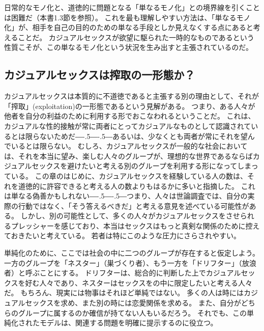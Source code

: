 \documentclass[paper=a4,book,openany]{jlreq}
\def\DDASH{―\kern-.5\zw―\kern-.5\zw―} %
\begin{document}
日常的なモノ化と、道徳的に問題となる「単なるモノ化」との境界線を引くことは困難だ（本書1.3節を参照）。
これを最も理解しやすい方法は、「単なるモノ化」が、相手を自己の目的のための単なる手段としか見えなくする点にあると考えることだ。
カジュアルセックスが欲望に駆られた一時的なものであるという性質こそが、この単なるモノ化という状況を生み出すと主張されているのだ。

\subsection{カジュアルセックスは搾取の一形態か？}

カジュアルセックスは本質的に不道徳であると主張する別の理由として、それが「搾取」(exploitation)の一形態であるという見解がある。
つまり、ある人々が他者を自分の利益のために利用する形でおこなわれるということだ。
これは、カジュアルな性的接触が常に両者にとってカジュアルなものとして認識されているとは限らないためだ{\DDASH}あるいは、少なくとも両者が常にそれを望んでいるとは限らない。
むしろ、カジュアルセックスが一般的な社会においては、それを本当に望み、楽しむ人々のグループが、理想的な世界であるならばカジュアルセックスを避けたいと考える別のグループを利用する形になってしまっている。
この章のはじめに、カジュアルセックスを経験している人の数は、それを道徳的に許容できると考える人の数よりもはるかに多いと指摘した。
これは単なる偽善かもしれない{\DDASH}つまり、人々は世論調査では、自分の実際の行動ではなく、「そう答えるべきだ」と考える意見を述べている可能性がある。
しかし、別の可能性として、多くの人々がカジュアルセックスをさせられるプレッシャーを感じており、本当はセックスはもっと真剣な関係のために控えておきたいと考えている。
若者は特にこのような圧力にさらされやすい。

単純化のために、ここでは社会の中に二つのグループが存在すると仮定しよう。
一方のグループを「ネスター」（巣づくり者）、もう一方を「ドリフター」（放浪者）と呼ぶことにする。
ドリフターは、総合的に判断した上でカジュアルセックスを好む人々であり、ネスターはセックスをの中に限定したいと考える人々だ。
もちろん、現実には物事はそれほど単純ではない。
多くの人は時にはカジュアルセックスを求め、また別の時には恋愛関係を求める。
また、自分がどちらのグループに属するのか確信が持てない人もいるだろう。
それでも、この単純化されたモデルは、関連する問題を明確に提示するのに役立つ。
\end{document}
